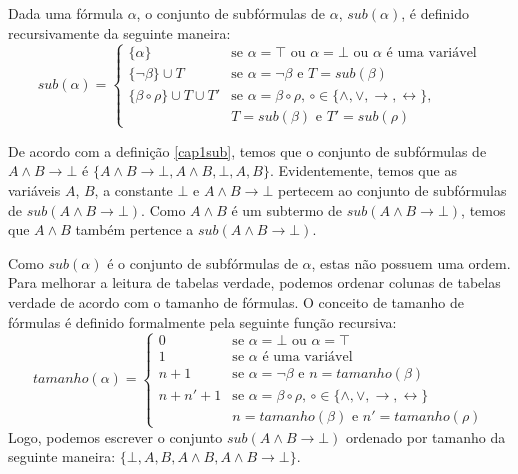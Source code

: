 \begin{Definition}\label{cap1sub}
Dada uma f\'ormula $\alpha$, o conjunto de subf\'ormulas de $\alpha$, $sub(\alpha)$,
\'e definido recursivamente da seguinte maneira:
\[
sub(\alpha) = \left\{
    \begin{array}{ll}
         \{\alpha\} & \text{se }\alpha = \top\text{ ou }\alpha =
         \bot\text{ ou }\alpha \text{ \'e uma vari\'avel}\\
         \{\neg \beta\} \cup T & \text{se }\alpha = \neg
         \beta\text{ e } T = sub(\beta)\\
         \{\beta \circ \rho\} \cup T \cup T' & \text{se }\alpha =
         \beta\circ\rho \text{,
         }\circ\in\{\land,\lor,\to,\leftrightarrow\}, \\
         & T =
         sub(\beta)\text{ e }T' =sub(\rho)
     \end{array}
                      \right.
\]
\end{Definition}
\begin{Example}
De acordo com a defini\c{c}\~ao \ref{cap1sub}, temos que o conjunto de
subf\'ormulas de $A \land B \to \bot$ \'e $\{A\land B \to \bot,A\land B,\bot,A,B\}$. Evidentemente, temos
que as vari\'aveis $A$, $B$, a constante $\bot$ e $A \land B \to\bot$
pertecem ao conjunto de subf\'ormulas de $sub(A \land B
\to\bot)$. Como $A\land B$ \'e um subtermo de $sub(A \land B \to
\bot)$, temos que $A\land B$ tamb\'em pertence a
$sub(A \land B \to\bot)$.
\end{Example}
Como $sub(\alpha)$ \'e o conjunto de subf\'ormulas de $\alpha$, estas
n\~ao possuem uma ordem. Para melhorar a leitura de tabelas verdade,
podemos ordenar colunas de tabelas verdade de acordo com o tamanho de
f\'ormulas. O conceito de tamanho de f\'ormulas \'e definido
formalmente pela seguinte fun\c{c}\~ao recursiva:
\[
tamanho(\alpha)=\left\{
  \begin{array}{ll}
    0       & \text{se }\alpha = \bot\text{ ou }\alpha = \top\\
    1      & \text{se }\alpha\text{ \'e uma vari\'avel}\\
    n +1 & \text{se }\alpha = \neg\beta\text{ e }n = tamanho(\beta)\\
    n + n' + 1 & \text{se }\alpha = \beta\circ\rho\text{,
    }\circ\in\{\land,\lor,\to,\leftrightarrow\}\\
                     & n = tamanho(\beta)\text{ e }n' = tamanho(\rho)
  \end{array}
                            \right .
\]
Logo, podemos escrever o conjunto $sub(A \land B \to\bot)$ ordenado
por tamanho da seguinte maneira: $\{\bot,A,B,A\land B,A\land B \to \bot\}$.

